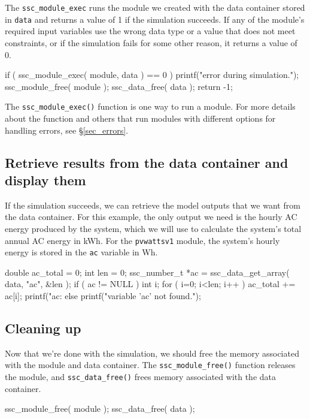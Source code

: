 \documentclass{article}
\begin{document}
The \texttt{ssc\_module\_exec} runs the module we created with the data container stored in \texttt{data} and returns a value of 1 if the simulation succeeds. If any of the module's required input variables use the wrong data type or a value that does not meet constraints, or if the simulation fails for some other reason, it returns a value of 0.

\begin{verbatimtab}[4]
	if ( ssc_module_exec( module, data ) == 0 )
	{
		printf("error during simulation.\n");
		ssc_module_free( module );
		ssc_data_free( data );
		return -1;
	}
\end{verbatimtab}

The \texttt{ssc\_module\_exec()} function is one way to run a module. For more details about the function and others that run modules with different options for handling errors, see \S\ref{sec_errors}.

\subsection{Retrieve results from the data container and display them}

If the simulation succeeds, we can retrieve the model outputs that we want from the data container. For this example, the only output we need is the hourly AC energy produced by the system, which we will use to calculate the system's total annual AC energy in kWh. For the \texttt{pvwattsv1} module, the system's hourly energy is stored in the \texttt{ac} variable in Wh.

\begin{verbatimtab}[4]
	double ac_total = 0;
	int len = 0;
	ssc_number_t *ac = ssc_data_get_array( data, "ac", &len );
	if ( ac != NULL )
	{
		int i;
		for ( i=0; i<len; i++ )
			ac_total += ac[i];
		printf("ac: %
	}
	else
	{
		printf("variable 'ac' not found.\n");
	}
\end{verbatimtab}

\subsection{Cleaning up}

Now that we're done with the simulation, we should free the memory associated with the module and data container. The \texttt{ssc\_module\_free()} function releases the module, and \texttt{ssc\_data\_free()} frees memory associated with the data container. 

\begin{verbatimtab}	
	ssc_module_free( module );
	ssc_data_free( data );
\end{verbatimtab}
\end{document}

